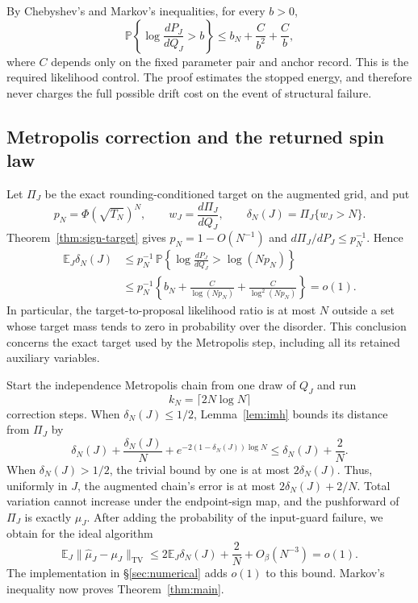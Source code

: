 \documentclass[11pt,reqno]{amsart}
\newcommand{\TV}{\operatorname{TV}}
\begin{document}
By Chebyshev's and Markov's inequalities, for every $b>0$,
\begin{equation*}
 \mathbb P\left\{\log\frac{dP_J}{dQ_J}>b\right\}
  \le b_N+\frac{C}{b^2}+\frac{C}{b},
\end{equation*}
where $C$ depends only on the fixed parameter pair and anchor record.
This is the required likelihood control. The proof estimates the
stopped energy, and therefore never charges the full possible drift
cost on the event of structural failure.

\subsection{Metropolis correction and the returned spin law}

Let $\Pi_J$ be the exact rounding-conditioned target on the augmented
grid, and put
\[
 p_N=\Phi(\sqrt{T_N})^N,
 \qquad w_J=\frac{d\Pi_J}{dQ_J},
 \qquad\delta_N(J)=\Pi_J\{w_J>N\}.
\]
Theorem~\ref{thm:sign-target} gives
$p_N=1-O(N^{-1})$ and $d\Pi_J/dP_J\le p_N^{-1}$.
Hence
\begin{align*}
 \mathbb E_J\delta_N(J)
 &\le p_N^{-1}\,
       \mathbb P\left\{\log\frac{dP_J}{dQ_J}>\log(Np_N)\right\}\\
 &\le p_N^{-1}\left\{b_N+
                 \frac{C}{\log(Np_N)}+
                 \frac{C}{\log^2(Np_N)}\right\}
   =o(1).
\end{align*}
In particular, the target-to-proposal likelihood ratio is at most $N$
outside a set whose target mass tends to zero in probability over the
disorder. This conclusion concerns the exact target used by the
Metropolis step, including all its retained auxiliary variables.

Start the independence Metropolis chain from one draw of $Q_J$ and run
\[
 k_N=\lceil2N\log N\rceil
\]
correction steps. When $\delta_N(J)\le1/2$,
Lemma~\ref{lem:imh} bounds its distance from $\Pi_J$ by
\[
 \delta_N(J)+\frac{\delta_N(J)}N
       +e^{-2(1-\delta_N(J))\log N}
 \le\delta_N(J)+\frac2N.
\]
When $\delta_N(J)>1/2$, the trivial bound by one is at most
$2\delta_N(J)$. Thus, uniformly in $J$, the augmented chain's error
is at most $2\delta_N(J)+2/N$. Total variation cannot increase under
the endpoint-sign map, and the pushforward of $\Pi_J$ is exactly
$\mu_J$. After adding the probability of the input-guard failure,
we obtain for the ideal algorithm
\[
 \mathbb E_J\|\widehat\mu_J-\mu_J\|_{\TV}
  \le2\mathbb E_J\delta_N(J)+\frac2N+O_\beta(N^{-3})=o(1).
\]
The implementation in \S\ref{sec:numerical} adds $o(1)$ to this bound.
Markov's inequality now proves Theorem~\ref{thm:main}.
\end{document}
